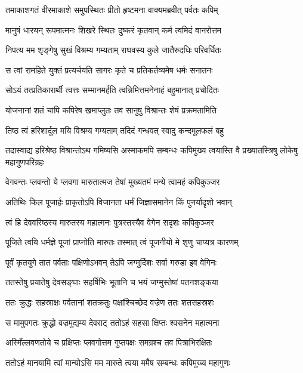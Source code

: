 \twolineshloka
{तमाकाशगतं वीरमाकाशे समुपस्थितः}
{प्रीतो हृष्टमना वाक्यमब्रवीत् पर्वतः कपिम्} %

\twolineshloka
{मानुषं धारयन् रूपमात्मनः शिखरे स्थितः}
{दुष्करं कृतवान् कर्म त्वमिदं वानरोत्तम} %

\twolineshloka
{निपत्य मम शृङ्गेषु सुखं विश्रम्य गम्यताम्}
{राघवस्य कुले जातैरुदधिः परिवर्धितः} %

\twolineshloka
{स त्वां रामहिते युक्तं प्रत्यर्चयति सागरः}
{कृते च प्रतिकर्तव्यमेष धर्मः सनातनः} %

\twolineshloka
{सोऽयं तत्प्रतिकारार्थी त्वत्तः सम्मानमर्हति}
{त्वन्निमित्तमनेनाहं बहुमानात् प्रचोदितः} %

\twolineshloka
{योजनानां शतं चापि कपिरेष खमाप्लुतः}
{तव सानुषु विश्रान्तः शेषं प्रक्रमतामिति} %

\twolineshloka
{तिष्ठ त्वं हरिशार्दूल मयि विश्रम्य गम्यताम्}
{तदिदं गन्धवत् स्वादु कन्दमूलफलं बहु} %

\threelineshloka
{तदास्वाद्य हरिश्रेष्ठ विश्रान्तोऽथ गमिष्यसि}
{अस्माकमपि सम्बन्धः कपिमुख्य त्वयास्ति वै}
{प्रख्यातस्त्रिषु लोकेषु महागुणपरिग्रहः} %

\twolineshloka
{वेगवन्तः प्लवन्तो ये प्लवगा मारुतात्मज}
{तेषां मुख्यतमं मन्ये त्वामहं कपिकुञ्जर} %

\twolineshloka
{अतिथिः किल पूजार्हः प्राकृतोऽपि विजानता}
{धर्मं जिज्ञासमानेन किं पुनर्यादृशो भवान्} %

\twolineshloka
{त्वं हि देववरिष्ठस्य मारुतस्य महात्मनः}
{पुत्रस्तस्यैव वेगेन सदृशः कपिकुञ्जर} %

\twolineshloka
{पूजिते त्वयि धर्मज्ञे पूजां प्राप्नोति मारुतः}
{तस्मात् त्वं पूजनीयो मे शृणु चाप्यत्र कारणम्} %

\twolineshloka
{पूर्वं कृतयुगे तात पर्वताः पक्षिणोऽभवन्}
{तेऽपि जग्मुर्दिशः सर्वा गरुडा इव वेगिनः} %

\twolineshloka
{ततस्तेषु प्रयातेषु देवसङ्घाः सहर्षिभिः}
{भूतानि च भयं जग्मुस्तेषां पतनशङ्कया} %

\twolineshloka
{ततः क्रुद्धः सहस्राक्षः पर्वतानां शतक्रतुः}
{पक्षांश्चिच्छेद वज्रेण ततः शतसहस्रशः} %

\twolineshloka
{स मामुपगतः क्रुद्धो वज्रमुद्यम्य देवराट्}
{ततोऽहं सहसा क्षिप्तः श्वसनेन महात्मना} %

\twolineshloka
{अस्मिँल्लवणतोये च प्रक्षिप्तः प्लवगोत्तम}
{गुप्तपक्षः समग्रश्च तव पित्राभिरक्षितः} %

\twolineshloka
{ततोऽहं मानयामि त्वां मान्योऽसि मम मारुते}
{त्वया ममैष सम्बन्धः कपिमुख्य महागुणः} %

